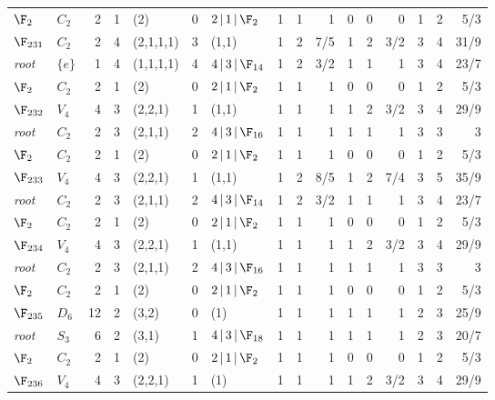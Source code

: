 \begin{landscape}
{\begin{longtable}{@{}l l r r l r l rrr rrr rrr@{}}
\quad$\F_{2}$ & $C_{2}$ & 2 & 1 & (2) & 0 & $2\,|\,1\,|\,\F_{2}$ & 1 & 1 & 1 & 0 & 0 & 0 & 1 & 2 & 5/3 \\
\addlinespace[3pt]
\textbf{$\F_{231}$} & $C_{2}$ & 2 & 4 & (2,1,1,1) & 3 & (1,1) & 1 & 2 & 7/5 & 1 & 2 & 3/2 & 3 & 4 & 31/9 \\
\quad\textit{root} & $\{e\}$ & 1 & 4 & (1,1,1,1) & 4 & $4\,|\,3\,|\,\F_{14}$ & 1 & 2 & 3/2 & 1 & 1 & 1 & 3 & 4 & 23/7 \\
\quad$\F_{2}$ & $C_{2}$ & 2 & 1 & (2) & 0 & $2\,|\,1\,|\,\F_{2}$ & 1 & 1 & 1 & 0 & 0 & 0 & 1 & 2 & 5/3 \\
\addlinespace[3pt]
\textbf{$\F_{232}$} & $V_{4}$ & 4 & 3 & (2,2,1) & 1 & (1,1) & 1 & 1 & 1 & 1 & 2 & 3/2 & 3 & 4 & 29/9 \\
\quad\textit{root} & $C_{2}$ & 2 & 3 & (2,1,1) & 2 & $4\,|\,3\,|\,\F_{16}$ & 1 & 1 & 1 & 1 & 1 & 1 & 3 & 3 & 3 \\
\quad$\F_{2}$ & $C_{2}$ & 2 & 1 & (2) & 0 & $2\,|\,1\,|\,\F_{2}$ & 1 & 1 & 1 & 0 & 0 & 0 & 1 & 2 & 5/3 \\
\addlinespace[3pt]
\textbf{$\F_{233}$} & $V_{4}$ & 4 & 3 & (2,2,1) & 1 & (1,1) & 1 & 2 & 8/5 & 1 & 2 & 7/4 & 3 & 5 & 35/9 \\
\quad\textit{root} & $C_{2}$ & 2 & 3 & (2,1,1) & 2 & $4\,|\,3\,|\,\F_{14}$ & 1 & 2 & 3/2 & 1 & 1 & 1 & 3 & 4 & 23/7 \\
\quad$\F_{2}$ & $C_{2}$ & 2 & 1 & (2) & 0 & $2\,|\,1\,|\,\F_{2}$ & 1 & 1 & 1 & 0 & 0 & 0 & 1 & 2 & 5/3 \\
\addlinespace[3pt]
\textbf{$\F_{234}$} & $V_{4}$ & 4 & 3 & (2,2,1) & 1 & (1,1) & 1 & 1 & 1 & 1 & 2 & 3/2 & 3 & 4 & 29/9 \\
\quad\textit{root} & $C_{2}$ & 2 & 3 & (2,1,1) & 2 & $4\,|\,3\,|\,\F_{16}$ & 1 & 1 & 1 & 1 & 1 & 1 & 3 & 3 & 3 \\
\quad$\F_{2}$ & $C_{2}$ & 2 & 1 & (2) & 0 & $2\,|\,1\,|\,\F_{2}$ & 1 & 1 & 1 & 0 & 0 & 0 & 1 & 2 & 5/3 \\
\addlinespace[3pt]
\textbf{$\F_{235}$} & $D_{6}$ & 12 & 2 & (3,2) & 0 & (1) & 1 & 1 & 1 & 1 & 1 & 1 & 2 & 3 & 25/9 \\
\quad\textit{root} & $S_{3}$ & 6 & 2 & (3,1) & 1 & $4\,|\,3\,|\,\F_{18}$ & 1 & 1 & 1 & 1 & 1 & 1 & 2 & 3 & 20/7 \\
\quad$\F_{2}$ & $C_{2}$ & 2 & 1 & (2) & 0 & $2\,|\,1\,|\,\F_{2}$ & 1 & 1 & 1 & 0 & 0 & 0 & 1 & 2 & 5/3 \\
\addlinespace[3pt]
\textbf{$\F_{236}$} & $V_{4}$ & 4 & 3 & (2,2,1) & 1 & (1) & 1 & 1 & 1 & 1 & 2 & 3/2 & 3 & 4 & 29/9 \\

\end{longtable}}
\end{landscape}
